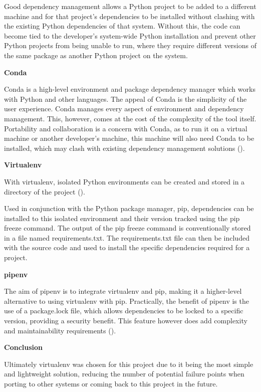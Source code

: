 Good dependency management allows a Python project to be added to a different machine and for that project's dependencies to be installed without clashing with the existing Python dependencies of that system. Without this, the code can become tied to the developer's system-wide Python installation and prevent other Python projects from being unable to run, where they require different versions of the same package as another Python project on the system.

\textbf{Conda}

Conda is a high-level environment and package dependency manager which works with Python and other languages. The appeal of Conda is the simplicity of the user experience. Conda manages every aspect of environment and dependency management. This, however, comes at the cost of the complexity of the tool itself. Portability and collaboration is a concern with Conda, as to run it on a virtual machine or another developer's machine, this machine will also need Conda to be installed, which may clash with existing dependency management solutions (\cite{Conda2023}).

\textbf{Virtualenv}

With virtualenv, isolated Python environments can be created and stored in a directory of the project (\cite{virtualenv2023}).

Used in conjunction with the Python package manager, pip, dependencies can be installed to this isolated environment and their version tracked using the pip freeze command. The output of the pip freeze command is conventionally stored in a file named requirements.txt. The requirements.txt file can then be included with the source code and used to install the specific dependencies required for a project.

\textbf{pipenv}

The aim of pipenv is to integrate virtualenv and pip, making it a higher-level alternative to using virtualenv with pip. Practically, the benefit of pipenv is the use of a package.lock file, which allows dependencies to be locked to a specific version, providing a security benefit. This feature however does add complexity and maintainability requirements (\cite{Reitz2023}).

\textbf{Conclusion}

Ultimately virtualenv was chosen for this project due to it being the most simple and lightweight solution, reducing the number of potential failure points when porting to other systems or coming back to this project in the future.

